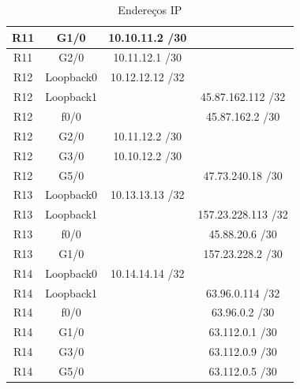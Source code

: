\documentclass[11pt,english, openright, oneside]{book}
\begin{document}
\begin{table}[H]
\begin{tabular}{|c|c|c|c|}
R11 & G1/0 & 10.10.11.2 /30 & \\ \hline
R11 & G2/0 & 10.11.12.1 /30 & \\ \hline
R12 & Loopback0 & 10.12.12.12 /32 & \\ \hline
R12 & Loopback1 & & 45.87.162.112 /32 \\ \hline
R12 & f0/0 & & 45.87.162.2 /30 \\ \hline
R12 & G2/0 & 10.11.12.2 /30 & \\ \hline
R12 & G3/0 & 10.10.12.2 /30 & \\ \hline
R12 & G5/0 & & 47.73.240.18 /30 \\ \hline
R13 & Loopback0 & 10.13.13.13 /32 & \\ \hline
R13 & Loopback1 & & 157.23.228.113 /32 \\ \hline
R13 & f0/0 & & 45.88.20.6 /30 \\ \hline
R13 & G1/0 & & 157.23.228.2 /30 \\ \hline
R14 & Loopback0 & 10.14.14.14 /32 & \\ \hline
R14 & Loopback1 & & 63.96.0.114 /32 \\ \hline
R14 & f0/0 & & 63.96.0.2 /30 \\ \hline
R14 & G1/0 & & 63.112.0.1 /30 \\ \hline
R14 & G3/0 & & 63.112.0.9 /30 \\ \hline
R14 & G5/0 & & 63.112.0.5 /30 \\ \hline
\end{tabular}
\caption{Endereços IP}
\label{tab:ip1}
\end{table}
\end{document}
